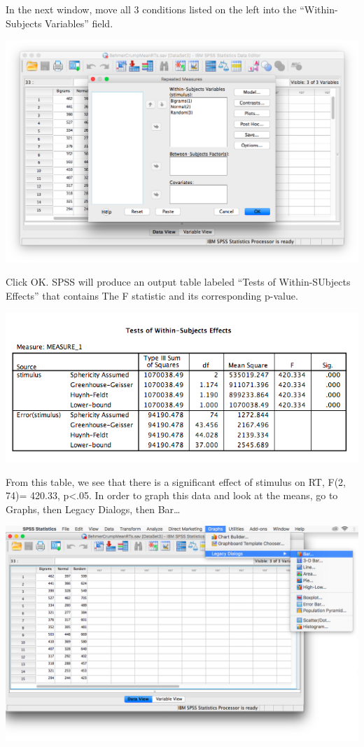 \documentclass[
]{book}
\begin{document}
In the next window, move all 3 conditions listed on the left into the ``Within-Subjects Variables'' field.

\includegraphics{img/9.4.25.png}

Click {OK}. SPSS will produce an output table labeled ``Tests of Within-SUbjects Effects'' that contains The F statistic and its corresponding p-value.

\includegraphics{img/9.4.26.png}

From this table, we see that there is a significant effect of stimulus on RT, F(2, 74)= 420.33, p\textless.05. In order to graph this data and look at the means, go to {Graphs}, then {Legacy Dialogs}, then {Bar\ldots{}}

\includegraphics{img/9.4.27.png}
\end{document}

